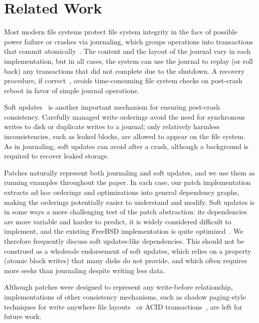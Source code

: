 \section{Related Work}
\label{sec:related}


Most modern file systems protect file system integrity in the face of
possible power failure or crashes via journaling, which groups
operations into transactions that commit
atomically~\cite{seltzer00journaling}.
The content and the layout of the
journal vary in each implementation, but in all cases, the system can use the
journal to replay (or roll back) any transactions that did not complete due to
the shutdown. A recovery procedure, if correct~\cite{yang04using}, 
avoids time-consuming
file system
checks on post-crash reboot in favor of simple journal operations.

Soft updates~\cite{ganger00soft} is another important mechanism for
ensuring post-crash consistency. Carefully managed write orderings
avoid the need for synchronous writes to disk or duplicate writes to
a journal; only relatively harmless inconsistencies, such as leaked blocks,
are allowed to appear on the file system. As in journaling, soft updates
can avoid  after a crash, although a background  is
required to recover leaked storage.

Patches naturally represent both journaling and soft updates,
and we use them as running examples throughout the paper.
%
In each case, our patch implementation extracts ad hoc orderings and
optimizations into general dependency graphs, making the orderings
potentially easier to understand and modify.
%
Soft updates is in some ways a more challenging test of the patch
abstraction: its dependencies are more variable and harder to predict,
it is widely considered difficult to implement, and the existing FreeBSD
implementation is quite optimized~\cite{mckusick99soft}.
%
We therefore frequently discuss soft updates-like
dependencies.
%
This should not be construed as a wholesale endorsement of soft updates,
which relies on a property (atomic block writes) that many disks do not
provide, and which often requires more seeks than journaling
despite writing less data.

Although patches were designed to represent any write-before relationship,
implementations of other consistency mechanisms, such as shadow
paging-style techniques for write anywhere file
layouts~\cite{hitz94file} or ACID transactions~\cite{wright06extending}, are left for future work.

